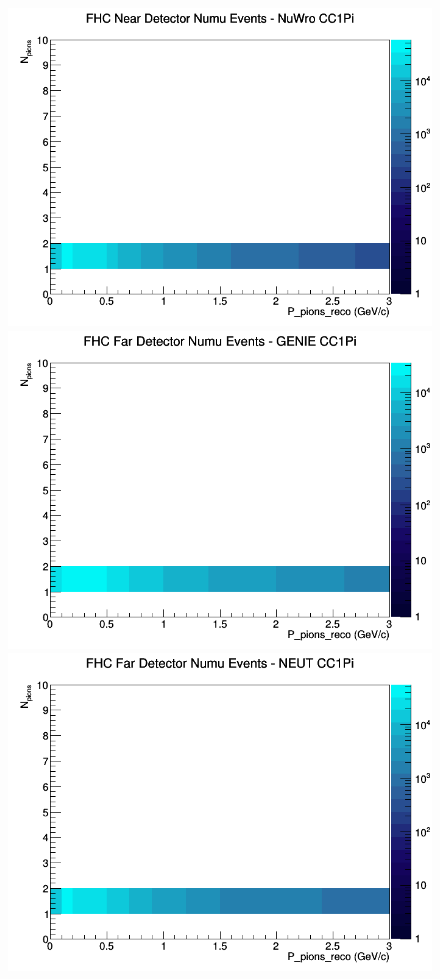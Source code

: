 \documentclass[12pt]{article}
\begin{document}
\begin{figure}[h]
\includegraphics[width=\linewidth]{eff_N_P/GAr/pions/CC1Pi_FHC_ND_numu_N_P_NuWro.png}
\endminipage
\newline
{}
\includegraphics[width=\linewidth]{eff_N_P/GAr/pions/CC1Pi_FHC_FD_numu_N_P_GENIE.png}
\endminipage
{}
\includegraphics[width=\linewidth]{eff_N_P/GAr/pions/CC1Pi_FHC_FD_numu_N_P_NEUT.png}

\end{figure}
\end{document}

